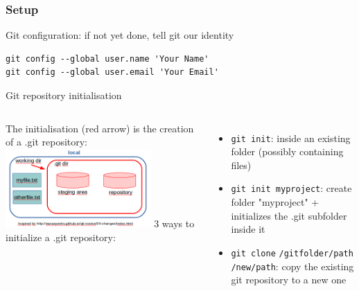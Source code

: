 \begin{frame}[containsverbatim]
\frametitle{ Setup}
\begin{block}{Git configuration: if not yet done, tell git our identity}
\begin{lstlisting}
git config --global user.name 'Your Name'
git config --global user.email 'Your Email'
\end{lstlisting}
\end{block}
\begin{block}{Git repository initialisation}
\begin{columns}
   The initialisation (red arrow) is the creation of a .git repository:
   \includegraphics[height=3cm]{05_history/Images/FAIR_git_init.png}
   3 ways to initialize a .git repository:
   \begin{itemize}
       \item \verb|git init|: inside an existing folder (possibly containing files)
       \item \verb|git init myproject|: create folder "myproject" + initializes the .git subfolder inside it
       \item \verb|git clone| \verb|/gitfolder/path| \verb|/new/path|: copy the existing git repository to a new one
    \end{itemize}
\end{columns}
\end{block}
\end{frame}
